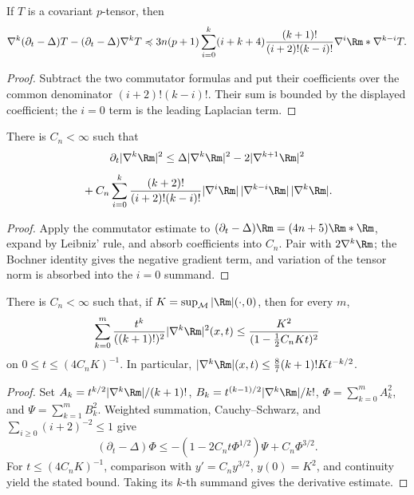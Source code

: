 \begin{corollary}
\label{cor:chow-ii-nabla-heat-commutator}
If \(T\) is a covariant \(p\)-tensor, then
\[
 \nabla^k(\partial_t-\Delta)T-(\partial_t-\Delta)\nabla^kT
 \preccurlyeq3n(p+1)\sum_{i=0}^k(i+k+4)
 \frac{(k+1)!}{(i+2)!(k-i)!}\nabla^i\Rm*\nabla^{k-i}T.
\]
\end{corollary}
\begin{proof}
\sketch
{}
Subtract the two commutator formulas and put their coefficients over the
common denominator \((i+2)!(k-i)!\).  Their sum is bounded by the displayed
coefficient; the \(i=0\) term is the leading Laplacian term.
\end{proof}

\begin{lemma}
\label{lem:chow-ii-curvature-derivative-evolution-inequality}
There is \(C_n<\infty\) such that
\[
 \partial_t|\nabla^k\Rm|^2\leq\Delta|\nabla^k\Rm|^2
 -2|\nabla^{k+1}\Rm|^2
\]
\[
 {}+C_n\sum_{i=0}^k\frac{(k+2)!}{(i+2)!(k-i)!}
 |\nabla^i\Rm|\,|\nabla^{k-i}\Rm|\,|\nabla^k\Rm|.
\]
\end{lemma}
\begin{proof}
\sketch
{}
Apply the commutator estimate to
\((\partial_t-\Delta)\Rm=(4n+5)\Rm*\Rm\), expand by Leibniz' rule, and
absorb coefficients into \(C_n\).  Pair with \(2\nabla^k\Rm\); the Bochner
identity gives the negative gradient term, and variation of the tensor norm
is absorbed into the \(i=0\) summand.
\end{proof}

\begin{lemma}
\label{lem:chow-ii-main-factorial-curvature-estimate}
There is \(C_n<\infty\) such that, if
\(K=\sup_{\mathcal M}|\Rm|(\cdot,0)\), then for every \(m\),
\[
 \sum_{k=0}^m\frac{t^k}{((k+1)!)^2}|\nabla^k\Rm|^2(x,t)
 \leq\frac{K^2}{(1-\tfrac12C_nKt)^2}
\]
on \(0\leq t\leq(4C_nK)^{-1}\).  In particular,
\(|\nabla^k\Rm|(x,t)\leq\frac87(k+1)!Kt^{-k/2}\).
\end{lemma}
\begin{proof}
\sketch
{}
Set \(A_k=t^{k/2}|\nabla^k\Rm|/(k+1)!\),
\(B_k=t^{(k-1)/2}|\nabla^k\Rm|/k!\),
\(\Phi=\sum_{k=0}^mA_k^2\), and \(\Psi=\sum_{k=1}^mB_k^2\).
Weighted summation, Cauchy--Schwarz, and
\(\sum_{i\geq0}(i+2)^{-2}\leq1\) give
\[
 (\partial_t-\Delta)\Phi
 \leq-(1-2C_nt\Phi^{1/2})\Psi+C_n\Phi^{3/2}.
\]
For \(t\leq(4C_nK)^{-1}\), comparison with
\(y'=C_ny^{3/2}\), \(y(0)=K^2\), and continuity yield the stated bound.
Taking its \(k\)-th summand gives the derivative estimate.
\end{proof}


